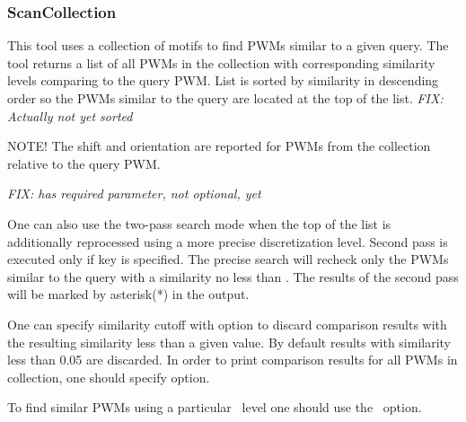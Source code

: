 \subsubsection{ScanCollection}
This tool uses a collection of motifs to find PWMs similar to a given query. The tool returns 
a list of all PWMs in the collection with corresponding similarity levels comparing to the query 
PWM. List is sorted by similarity in descending order so the PWMs similar to the query are 
located at the top of the list.
\emph{FIX: Actually not yet sorted}


NOTE! The shift and orientation are reported for PWMs from the collection relative to the query 
PWM.


\emph{FIX:  has required parameter, not optional, yet}

One can also use the two-pass search mode when the top of the list is additionally 
reprocessed using a more precise discretization level. Second pass is executed only 
if 
key is specified. The precise search will recheck only the PWMs 
similar to the query with a similarity no less than . The results of the second pass 
will be marked by asterisk(*) in the output.

One can specify similarity cutoff with option  to discard 
comparison results with the resulting similarity less than a given value. By default results with similarity less than 0.05 are discarded.
In order to print comparison results for all PWMs in collection, one should specify  option.


To find similar PWMs using a particular \pvalue\ level one should use the ~option.

